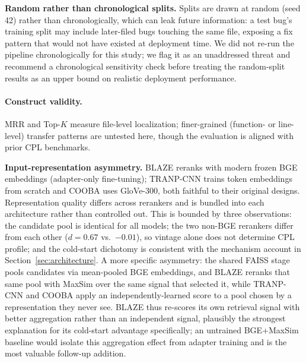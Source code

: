 \documentclass[a4paper,fleqn]{cas-dc}
\begin{document}
\textbf{Random rather than chronological splits.}
Splits are drawn at random (seed 42) rather than chronologically, which can
leak future information: a test bug's training split may include later-filed
bugs touching the same file, exposing a fix pattern that would not have
existed at deployment time. We did not re-run the pipeline chronologically
for this study; we flag it as an unaddressed threat and recommend a
chronological sensitivity check before treating the random-split results as
an upper bound on realistic deployment performance.

\paragraph{Construct validity.}
MRR and Top-$K$ measure file-level localization; finer-grained (function- or
line-level) transfer patterns are untested here, though the evaluation is
aligned with prior CPL benchmarks.

\textbf{Input-representation asymmetry.}
BLAZE reranks with modern frozen BGE embeddings (adapter-only fine-tuning);
TRANP-CNN trains token embeddings from scratch and COOBA uses GloVe-300,
both faithful to their original designs. Representation quality differs
across rerankers and is bundled into each architecture rather than
controlled out. This is bounded by three observations: the candidate pool
is identical for all models; the two non-BGE rerankers differ from each
other ($d = 0.67$ vs.\ $-0.01$), so vintage alone does not determine CPL
profile; and the cold-start dichotomy is consistent with the mechanism
account in Section~\ref{sec:architecture}. A more specific asymmetry: the shared
FAISS stage pools candidates via mean-pooled BGE embeddings, and BLAZE
reranks that same pool with MaxSim over the same signal that selected it,
while TRANP-CNN and COOBA apply an independently-learned score to a pool
chosen by a representation they never see. BLAZE thus re-scores its own
retrieval signal with better aggregation rather than an independent
signal, plausibly the strongest explanation for its cold-start advantage
specifically; an untrained BGE+MaxSim baseline would isolate this
aggregation effect from adapter training and is the most valuable follow-up
addition.
\end{document}
